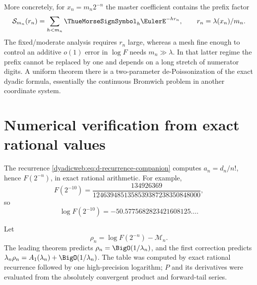 \documentclass[11pt,oneside]{article}
\theoremstyle{definition}
\theoremstyle{remark}
\begin{document}
More concretely, for $x_n=m_n2^{-n}$ the master coefficient contains the prefix factor
\begin{equation}
 \mathcal S_{m_n}(r_n)=\sum_{h<m_n}\ThueMorseSignSymbol_h\EulerE^{-hr_n},
 \qquad r_n=\lambda(x_n)/m_n.                              \label{dyadicasym:eq:large-prefix-problem}
\end{equation}
The fixed/moderate analysis requires $r_n$ large, whereas a mesh fine enough to control
an additive $o(1)$ error in $\log F$ needs $m_n\gg\lambda$.  In that latter regime the
prefix cannot be replaced by one and depends on a long stretch of numerator digits.  A
uniform theorem there is a two-parameter de-Poissonization of the exact dyadic formula,
essentially the continuous Bromwich problem in another coordinate system.

\section{Numerical verification from exact rational values}
\label{dyadicasym:sec:numerics}

The recurrence \eqref{dyadicweb:eq:d-recurrence-companion} computes $a_n=d_n/n!$, hence $F(2^{-n})$, in exact rational
arithmetic.  For example,
\begin{equation}
 F(2^{-10})=
 \frac{134926369}{1246394851358539387238350848000},         \label{dyadicasym:eq:F10}
\end{equation}
so
\begin{equation*}
 \log F(2^{-10})=-50.5775682823421608125\ldots.
\end{equation*}

Let
\begin{equation}
 \rho_n=\log F(2^{-n})-\mathcal M_n.                        \label{dyadicasym:eq:rho}
\end{equation}
The leading theorem predicts $\rho_n=\BigO(1/\lambda_n)$, and the first correction predicts
$\lambda_n\rho_n=A_1(\lambda_n)+\BigO(1/\lambda_n)$.  The table was computed by exact rational
recurrence followed by one high-precision logarithm; $P$ and its derivatives were evaluated
from the absolutely convergent product and forward-tail series.
\end{document}
